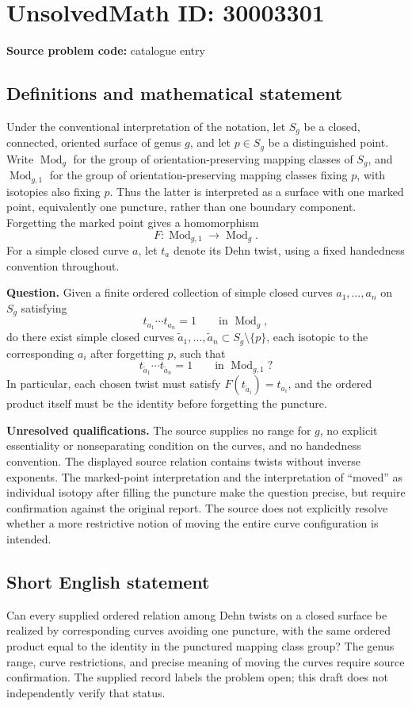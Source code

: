 \documentclass[11pt]{article}
\begin{document}
\section*{UnsolvedMath ID: 30003301}
\textbf{Source problem code:} catalogue entry
\subsection{Definitions and mathematical statement}
Under the conventional interpretation of the notation, let \(S_g\) be a closed, connected, oriented surface of genus \(g\), and let \(p\in S_g\) be a distinguished point. Write \(\operatorname{Mod}_g\) for the group of orientation-preserving mapping classes of \(S_g\), and \(\operatorname{Mod}_{g,1}\) for the group of orientation-preserving mapping classes fixing \(p\), with isotopies also fixing \(p\). Thus the latter is interpreted as a surface with one marked point, equivalently one puncture, rather than one boundary component. Forgetting the marked point gives a homomorphism
\[
F:\operatorname{Mod}_{g,1}\longrightarrow\operatorname{Mod}_g.
\]
For a simple closed curve \(a\), let \(t_a\) denote its Dehn twist, using a fixed handedness convention throughout.

\textbf{Question.} Given a finite ordered collection of simple closed curves \(a_1,\ldots,a_n\) on \(S_g\) satisfying
\[
t_{a_1}\cdots t_{a_n}=1\qquad\text{in }\operatorname{Mod}_g,
\]
do there exist simple closed curves \(\widetilde a_1,\ldots,\widetilde a_n\subset S_g\setminus\{p\}\), each isotopic to the corresponding \(a_i\) after forgetting \(p\), such that
\[
t_{\widetilde a_1}\cdots t_{\widetilde a_n}=1\qquad\text{in }\operatorname{Mod}_{g,1}?
\]
In particular, each chosen twist must satisfy \(F(t_{\widetilde a_i})=t_{a_i}\), and the ordered product itself must be the identity before forgetting the puncture.

\textbf{Unresolved qualifications.} The source supplies no range for \(g\), no explicit essentiality or nonseparating condition on the curves, and no handedness convention. The displayed source relation contains twists without inverse exponents. The marked-point interpretation and the interpretation of ``moved'' as individual isotopy after filling the puncture make the question precise, but require confirmation against the original report. The source does not explicitly resolve whether a more restrictive notion of moving the entire curve configuration is intended.
\subsection{Short English statement}
Can every supplied ordered relation among Dehn twists on a closed surface be realized by corresponding curves avoiding one puncture, with the same ordered product equal to the identity in the punctured mapping class group? The genus range, curve restrictions, and precise meaning of moving the curves require source confirmation. The supplied record labels the problem open; this draft does not independently verify that status.
\end{document}
